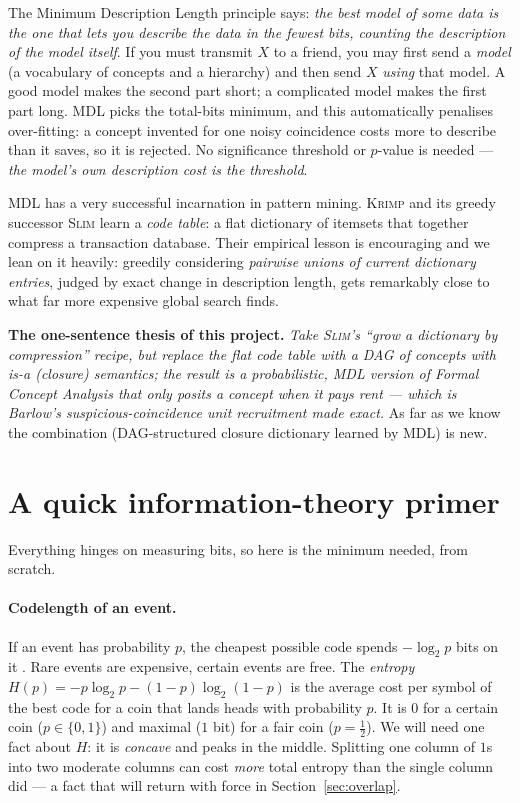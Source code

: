 \documentclass[11pt]{article}
\begin{document}
The Minimum Description Length principle \cite{rissanen1978,grunwald2007} says:
\emph{the best model of some data is the one that lets you describe the data in
the fewest bits, counting the description of the model itself}. If you must
transmit $X$ to a friend, you may first send a \emph{model} (a vocabulary of
concepts and a hierarchy) and then send $X$ \emph{using} that model. A good
model makes the second part short; a complicated model makes the first part
long. MDL picks the total-bits minimum, and this automatically penalises
over-fitting: a concept invented for one noisy coincidence costs more to
describe than it saves, so it is rejected. No significance threshold or $p$-value
is needed --- \emph{the model's own description cost is the threshold}.

MDL has a very successful incarnation in pattern mining. \textsc{Krimp}
\cite{vreeken2011} and its greedy successor \textsc{Slim} \cite{smets2012} learn
a \emph{code table}: a flat dictionary of itemsets that together compress a
transaction database. Their empirical lesson is encouraging and we lean on it
heavily: greedily considering \emph{pairwise unions of current dictionary
entries}, judged by exact change in description length, gets remarkably close to
what far more expensive global search finds.

\medskip
\noindent\textbf{The one-sentence thesis of this project.}
\emph{Take \textsc{Slim}'s ``grow a dictionary by compression'' recipe, but
replace the flat code table with a \emph{DAG of concepts with is-a (closure)
semantics}; the result is a probabilistic, MDL version of Formal Concept
Analysis that only posits a concept when it pays rent --- which is Barlow's
suspicious-coincidence unit recruitment made exact.} As far as we know the
combination (DAG-structured closure dictionary learned by MDL) is new.

\section{A quick information-theory primer}

Everything hinges on measuring bits, so here is the minimum needed, from
scratch.

\paragraph{Codelength of an event.} If an event has probability $p$, the
cheapest possible code spends $-\log_2 p$ bits on it \cite{shannon1948}.
Rare events are expensive, certain events are free. The \emph{entropy}
$H(p) = -p\log_2 p - (1-p)\log_2(1-p)$ is the average cost per symbol of the
best code for a coin that lands heads with probability $p$. It is $0$ for a
certain coin ($p\in\{0,1\}$) and maximal ($1$ bit) for a fair coin
($p=\tfrac12$). We will need one fact about $H$: it is \emph{concave} and peaks
in the middle. Splitting one column of $1$s into two moderate columns can cost
\emph{more} total entropy than the single column did --- a fact that will return
with force in Section~\ref{sec:overlap}.
\end{document}
